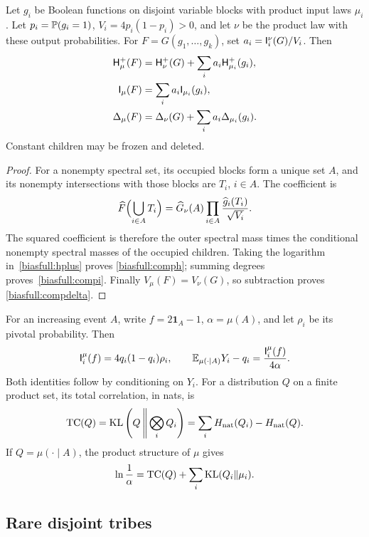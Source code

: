 \begin{lemma}\label{biasfull:composition}
Let \(g_i\) be Boolean functions on disjoint variable blocks with product
input laws \(\mu_i\). Let \(p_i=\P(g_i=1)\), \(V_i=4p_i(1-p_i)>0\), and
let \(\nu\) be the product law with these output probabilities.
For \(F=G(g_1,\ldots,g_k)\), set \(a_i=\I_i^\nu(G)/V_i\).
Then
\begin{align}
 \HH_\mu^+(F)&=\HH_\nu^+(G)+\sum_i a_i\HH_{\mu_i}^+(g_i),
       \label{biasfull:comph}\\
 \I_\mu(F)&=\sum_i a_i\I_{\mu_i}(g_i),
       \label{biasfull:compi}\\
 \Delta_\mu(F)&=\Delta_\nu(G)+\sum_i a_i\Delta_{\mu_i}(g_i).
       \label{biasfull:compdelta}
\end{align}
Constant children may be frozen and deleted.
\end{lemma}
\begin{proof}
For a nonempty spectral set, its occupied blocks form a unique set \(A\),
and its nonempty intersections with those blocks are \(T_i\), \(i\in A\).
The coefficient is
\[
 \wh F\Bigl(\bigcup_{i\in A}T_i\Bigr)
   =\wh G_\nu(A)\prod_{i\in A}\frac{\wh g_i(T_i)}{\sqrt{V_i}}.
\]
The squared coefficient is therefore the outer spectral mass times the
conditional nonempty spectral masses of the occupied children.
Taking the logarithm in~\eqref{biasfull:hplus} proves
\eqref{biasfull:comph}; summing degrees proves~\eqref{biasfull:compi}.
Finally \(V_\mu(F)=V_\nu(G)\), so subtraction proves
\eqref{biasfull:compdelta}.
\end{proof}

For an increasing event \(A\), write \(f=2\mathbf1_A-1\),
\(\alpha=\mu(A)\), and let \(\rho_i\) be its pivotal probability.
Then
\begin{equation}\label{biasfull:pivotal}
 \I_i^\mu(f)=4q_i(1-q_i)\rho_i,\qquad
 \E_{\mu(\cdot\mid A)}Y_i-q_i
       =\frac{\I_i^\mu(f)}{4\alpha}.
\end{equation}
Both identities follow by conditioning on \(Y_i\).
For a distribution \(Q\) on a finite product set, its total correlation,
in nats, is
\[
 \TC(Q)=\KL\left(Q\,\middle\|\,\bigotimes_iQ_i\right)
       =\sum_i H_{\rm nat}(Q_i)-H_{\rm nat}(Q).
\]
If \(Q=\mu(\cdot\mid A)\), the product structure of \(\mu\) gives
\begin{equation}\label{biasfull:tcdecomp}
 \ln\frac1\alpha
   =\TC(Q)+\sum_i\KL(Q_i\|\mu_i).
\end{equation}

\subsection{Rare disjoint tribes}

